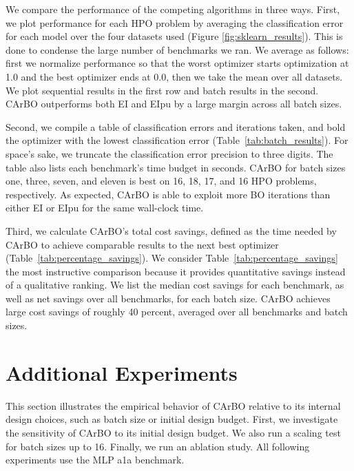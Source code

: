 \documentclass{article}
\begin{document}
We compare the performance of the competing algorithms in three ways. First, we plot performance for each HPO problem by averaging the classification error for each model over the four datasets used (Figure \ref{fig:sklearn_results}). This is done to condense the large number of benchmarks we ran. We average as follows: first we normalize performance so that the worst optimizer starts optimization at 1.0 and the best optimizer ends at 0.0, then we take the mean over all datasets. We plot sequential results in the first row and batch results in the second. CArBO outperforms both EI and EIpu by a large margin across all batch sizes.

Second, we compile a table of classification errors and iterations taken, and bold the optimizer with the lowest classification error (Table~\ref{tab:batch_results}). For space's sake, we truncate the classification error precision to three digits. The table also lists each benchmark's time budget in seconds. CArBO for batch sizes one, three, seven, and eleven is best on 16, 18, 17, and 16 HPO problems, respectively. As expected, CArBO is able to exploit more BO iterations than either EI or EIpu for the same wall-clock time. 

Third, we calculate CArBO's total cost savings, defined as the time needed by CArBO to achieve comparable results to the next best optimizer (Table~\ref{tab:percentage_savings}). We consider Table~\ref{tab:percentage_savings} the most instructive comparison because it provides quantitative savings instead of a qualitative ranking. We list the median cost savings for each benchmark, as well as net savings over all benchmarks, for each batch size. CArBO achieves large cost savings of roughly 40 percent, averaged over all benchmarks and batch sizes. 


\section{Additional Experiments} \label{Ablation study}
This section illustrates the empirical behavior of CArBO relative to its internal design choices, such as batch size or initial design budget. First, we investigate the sensitivity of CArBO to its initial design budget. We also run a scaling test for batch sizes up to 16. Finally, we run an ablation study. All following experiments use the MLP a1a benchmark. 
\end{document}
